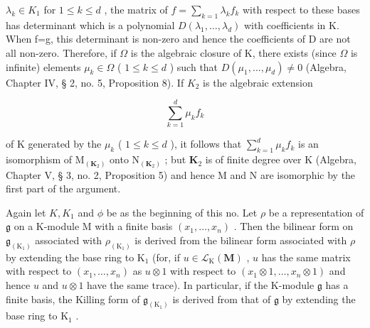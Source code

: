 \(\lambda_{k}\in K_{1}\) for \(1\leqslant k\leqslant d\) , the matrix of \(f=\sum_{k=1}\lambda_{k}f_{k}\) with respect to these bases has determinant which is a polynomial \(D(\lambda_{1},\ldots,\lambda_{d})\) with coefficients in K. When f=g, this determinant is non-zero and hence the coefficients of D are not all non-zero. Therefore, if \(\Omega\) is the algebraic closure of K, there exists (since \(\Omega\) is infinite) elements \(\mu_{k}\in\Omega\) ( \(1\leqslant k\leqslant d\) ) such that \(D(\mu_{1},\ldots,\mu_{d})\neq0\) (Algebra, Chapter IV, § 2, no. 5, Proposition 8). If \(K_{2}\) is the algebraic extension

\[
\sum_ {k = 1} ^ {d} \mu_ {k} f _ {k}
\]

of K generated by the \(\mu_{k}\) ( \(1 \leqslant k \leqslant d\) ), it follows that \(\sum_{k=1}^{d} \mu_{k} f_{k}\) is an isomorphism of \(\mathrm{M}_{(\mathbf{K}_{2})}\) onto \(\mathrm{N}_{(\mathbf{K}_{2})}\) ; but \(\mathbf{K}_{2}\) is of finite degree over K (Algebra, Chapter V, § 3, no. 2, Proposition 5) and hence M and N are isomorphic by the first part of the argument.

Again let \(K, K_{1}\) and \(\phi\) be as the beginning of this no. Let \(\rho\) be a representation of \(\mathfrak{g}\) on a K-module M with a finite basis \((x_{1},\ldots ,x_{n})\) . Then the bilinear form on \(\mathfrak{g}_{(\mathrm{K}_1)}\) associated with \(\rho_{(\mathrm{K}_1)}\) is derived from the bilinear form associated with \(\rho\) by extending the base ring to \(\mathrm{K}_1\) (for, if \(u\in \mathcal{L}_{\mathrm{K}}(\mathbf{M})\) , \(u\) has the same matrix with respect to \((x_{1},\dots,x_{n})\) as \(u\otimes 1\) with respect to \((x_{1}\otimes 1,\dots,x_{n}\otimes 1)\) and hence \(u\) and \(u\otimes 1\) have the same trace). In particular, if the K-module \(\mathfrak{g}\) has a finite basis, the Killing form of \(\mathfrak{g}_{(\mathrm{K}_1)}\) is derived from that of \(\mathfrak{g}\) by extending the base ring to \(\mathrm{K}_1\) .

